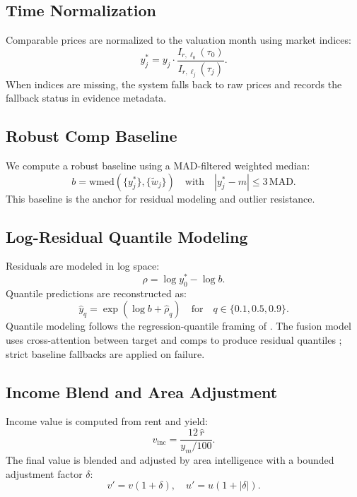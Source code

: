 \documentclass[11pt,a4paper]{article}
\begin{document}
\subsection{Time Normalization}
Comparable prices are normalized to the valuation month using market indices:
\begin{equation}
\label{eq:time_adjust}
 y_j^{\ast} = y_j \cdot \frac{I_{r,\ell_0}(\tau_0)}{I_{r,\ell_j}(\tau_j)}.
\end{equation}
When indices are missing, the system falls back to raw prices and records the
fallback status in evidence metadata.

\subsection{Robust Comp Baseline}
We compute a robust baseline using a MAD-filtered weighted median:
\begin{equation}
\label{eq:baseline_mad}
 b = \mathrm{wmed}(\{y_j^{\ast}\}, \{\tilde{w}_j\})\quad\text{with}\quad
|y_j^{\ast} - m| \le 3\,\mathrm{MAD}.
\end{equation}
This baseline is the anchor for residual modeling and outlier resistance.

\subsection{Log-Residual Quantile Modeling}
Residuals are modeled in log space:
\begin{equation}
\label{eq:residual}
 \rho = \log y_0^{\ast} - \log b.
\end{equation}
Quantile predictions are reconstructed as:
\begin{equation}
\label{eq:price_quantile}
 \hat{y}_q = \exp(\log b + \hat{\rho}_q)\quad\text{for}\quad q \in \{0.1, 0.5, 0.9\}.
\end{equation}
Quantile modeling follows the regression-quantile framing of
\cite{KoenkerBassett1978}.
The fusion model uses cross-attention between target and comps to produce
residual quantiles \cite{Vaswani2017,ReimersGurevych2019}; strict baseline
fallbacks are applied on failure.

\subsection{Income Blend and Area Adjustment}
Income value is computed from rent and yield:
\begin{equation}
\label{eq:income_value}
 v_{\text{inc}} = \frac{12\,\hat{r}}{y_m / 100}.
\end{equation}
The final value is blended and adjusted by area intelligence with a bounded
adjustment factor $\delta$:
\begin{equation}
\label{eq:area_adjust}
 v' = v (1 + \delta), \quad u' = u (1 + |\delta|).
\end{equation}
\end{document}

